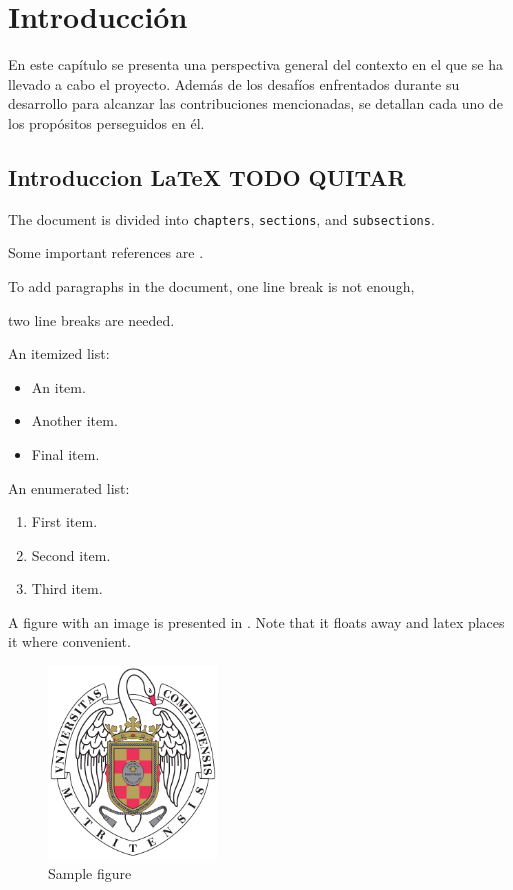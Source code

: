 \chapter{Introducción}

	En este capítulo se presenta una perspectiva general del contexto en el que se ha llevado a cabo el proyecto. Además de los desafíos enfrentados durante su desarrollo para alcanzar las contribuciones mencionadas, se detallan cada uno de los propósitos perseguidos en él.
	

	\section{Introduccion LaTeX TODO QUITAR}
		The document is divided into \texttt{chapters}, \texttt{sections}, and \texttt{subsections}.

		Some important references are \cite{einstein,latexcompanion,knuthwebsite}.

		To add paragraphs in the document, 
		one line break is not enough,

		two line breaks are needed.

		An itemized list:

		\begin{itemize}
			\item An item.
			\item Another item.
			\item Final item.
		\end{itemize}

		An enumerated list:

		\begin{enumerate}
			\item First item.
			\item Second item.
			\item Third item.
		\end{enumerate}

		A figure with an image is presented in . Note that it floats away and latex places it where convenient.

		\begin{figure}
			\centering
			\includegraphics[width=0.4\textwidth]{Images/escudo_ucm.pdf}
			\caption{Sample figure}
			\label{fig:figura}
		\end{figure}

